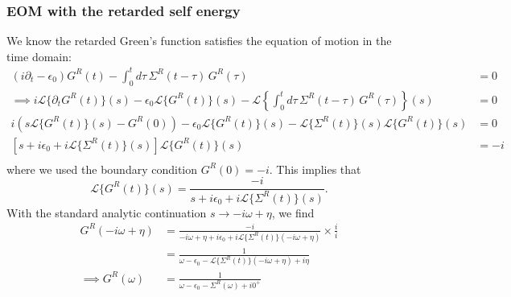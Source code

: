 \subsubsection{EOM with the retarded self energy}
We know the retarded Green's function satisfies the equation of motion in the time domain:
\begin{align}
    (i\partial_t - \epsilon_0) G^R(t) - \int_0^t d\tau\, \Sigma^R(t - \tau)\, G^R(\tau) &= 0 \label{eq:eom_retarded} \\
\implies i\mathcal{L}\{ \partial_t G^R(t)\}(s) - \epsilon_0 \mathcal{L} \{ G^R(t)\}(s) - \mathcal{L}\left\{\int_0^t d\tau\, \Sigma^R(t - \tau)\, G^R(\tau)\right\}(s) &= 0 \\
 i \left( s \mathcal{L} \{ G^R(t)\}(s) -G^R(0)\right)- \epsilon_0 \mathcal{L} \{ G^R(t)\}(s) - \mathcal{L}\{\Sigma^R(t)\}(s) \mathcal{L}\{G^R(t)\}(s) &= 0\\
\left[s + i\epsilon_0 + i\mathcal{L}\{\Sigma^R(t)\}(s)\right] \mathcal{L}\{G^R(t)\}(s) &= -i \\
\end{align}
where we used the boundary condition $G^R(0) = -i$.
This implies that
\begin{equation}
    \mathcal{L}\{G^R(t)\}(s) = \frac{-i}{s + i\epsilon_0 + i\mathcal{L}\{\Sigma^R(t)\}(s)}.
\end{equation}
With the standard analytic continuation $s \rightarrow -i\omega + \eta$, we find
\begin{align}
    G^R(-i\omega + \eta) &= \frac{-i}{-i\omega + \eta + i\epsilon_0 + i\mathcal{L}\{\Sigma^R(t)\}(-i\omega + \eta)} \times \frac{i}{i}\\
    &= \frac{1}{\omega - \epsilon_0 - \mathcal{L}\{\Sigma^R(t)\}(-i\omega + \eta) + i\eta} \\
   \implies  G^R(\omega) &= \frac{1}{\omega - \epsilon_0 - \Sigma^R(\omega) + i0^+}
\end{align}
